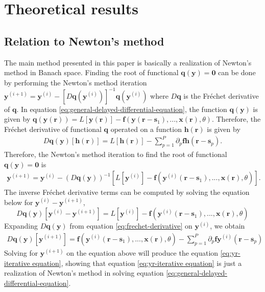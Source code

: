 \appendix

\section{Theoretical results}
\subsection{Relation to Newton's method}
\label{appsec:relation-to-newton}

The main method presented in this paper is basically a realization of Newton's method in Banach space.
Finding the root of functional $\mathbf{q}(\mathbf{y}) = \mathbf{0}$ can be done by performing the Newton's method iteration $\mathbf{y}^{(i+1)} = \mathbf{y}^{(i)} - [D\mathbf{q}(\mathbf{y}^{(i)})]^{-1} \mathbf{q}(\mathbf{y}^{(i)})$ where $D\mathbf{q}$ is the Fr\'{e}chet derivative of $\mathbf{q}$.
In equation \ref{eq:general-delayed-differential-equation}, the function $\mathbf{q}(\mathbf{y})$ is given by $\mathbf{q}(\mathbf{y}(\mathbf{r})) = L[\mathbf{y}(\mathbf{r})] - \mathbf{f}(\mathbf{y}(\mathbf{r}-\mathbf{s}_1), ..., \mathbf{x}(\mathbf{r}), \theta)$.
Therefore, the Fr\'{e}chet derivative of functional $\mathbf{q}$ operated on a function $\mathbf{h}(\mathbf{r})$ is given by
\begin{align}
\label{eq:frechet-derivative}
    D\mathbf{q}(\mathbf{y})[\mathbf{h}(\mathbf{r})] = L[\mathbf{h}(\mathbf{r})] - \sum_{p=1}^P\partial_p{\mathbf{f}}\mathbf{h}(\mathbf{r} - \mathbf{s}_p).
\end{align}
Therefore, the Newton's method iteration to find the root of functional $\mathbf{q}(\mathbf{y}) = \mathbf{0}$ is
\begin{align}
    \mathbf{y}^{(i + 1)} = \mathbf{y}^{(i)} - \left(D\mathbf{q}(\mathbf{y})\right)^{-1}\left[L[\mathbf{y}^{(i)}] - \mathbf{f}(\mathbf{y}^{(i)}(\mathbf{r}-\mathbf{s}_1), ..., \mathbf{x}(\mathbf{r}), \theta)\right].
\end{align}
The inverse Fr\'{e}chet derivative terms can be computed by solving the equation below for $\mathbf{y}^{(i)} - \mathbf{y}^{(i + 1)}$,
\begin{equation}
    D\mathbf{q}( \mathbf{y})\left[\mathbf{y}^{(i)} - \mathbf{y}^{(i + 1)}\right] = L[\mathbf{y}^{(i)}] - \mathbf{f}(\mathbf{y}^{(i)}(\mathbf{r} - \mathbf{s}_1), ..., \mathbf{x}(\mathbf{r}), \theta)
\end{equation}
Expanding $D\mathbf{q}(\mathbf{y})$ from equation \ref{eq:frechet-derivative} on $\mathbf{y}^{(i)}$, we obtain
\begin{align}
    D\mathbf{q}(\mathbf{y})[\mathbf{y}^{(i+1)}] = \mathbf{f}(\mathbf{y}^{(i)}(\mathbf{r} - \mathbf{s}_1), ..., \mathbf{x}(\mathbf{r}), \theta) - \sum_{p=1}^P \partial_p{\mathbf{f}}\mathbf{y}^{(i)}(\mathbf{r} - \mathbf{s}_p)
\end{align}
Solving for $\mathbf{y}^{(i+1)}$ on the equation above will produce the equation \ref{eq:yr-iterative equation}, showing that equation \ref{eq:yr-iterative equation} is just a realization of Newton's method in solving equation \ref{eq:general-delayed-differential-equation}.

